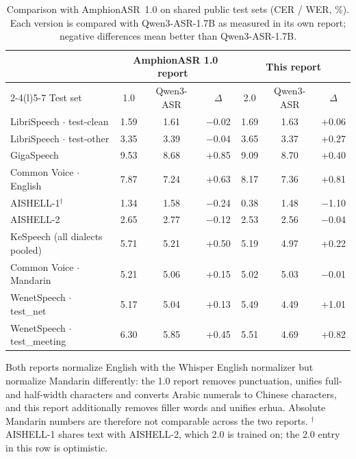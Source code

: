 \begin{table}[!tbp]
  \caption{Comparison with AmphionASR~1.0 on shared public test sets (CER / WER, \%). Each version is compared with Qwen3-ASR-1.7B as measured in its own report; negative differences mean better than Qwen3-ASR-1.7B.}
  \label{tab:vs_v1}
  \centering
  \small
  \setlength{\tabcolsep}{5pt}
  \begin{tabular}{@{}lcccccc@{}}
    \toprule
    & \multicolumn{3}{c}{AmphionASR 1.0 report~\cite{amphion2026amphionasr}} & \multicolumn{3}{c}{This report} \\
    \cmidrule(lr){2-4}\cmidrule(l){5-7}
    Test set & 1.0 & Qwen3-ASR & $\Delta$ & 2.0 & Qwen3-ASR & $\Delta$ \\
    \midrule
    LibriSpeech $\cdot$ test-clean & 1.59 & 1.61 & $-$0.02 & 1.69 & 1.63 & +0.06 \\
    LibriSpeech $\cdot$ test-other & 3.35 & 3.39 & $-$0.04 & 3.65 & 3.37 & +0.27 \\
    GigaSpeech & 9.53 & 8.68 & +0.85 & 9.09 & 8.70 & +0.40 \\
    Common Voice $\cdot$ English & 7.87 & 7.24 & +0.63 & 8.17 & 7.36 & +0.81 \\
    AISHELL-1$^\dagger$ & 1.34 & 1.58 & $-$0.24 & 0.38 & 1.48 & $-$1.10 \\
    AISHELL-2 & 2.65 & 2.77 & $-$0.12 & 2.53 & 2.56 & $-$0.04 \\
    KeSpeech (all dialects pooled) & 5.71 & 5.21 & +0.50 & 5.19 & 4.97 & +0.22 \\
    Common Voice $\cdot$ Mandarin & 5.21 & 5.06 & +0.15 & 5.02 & 5.03 & $-$0.01 \\
    WenetSpeech $\cdot$ test\_net & 5.17 & 5.04 & +0.13 & 5.49 & 4.49 & +1.01 \\
    WenetSpeech $\cdot$ test\_meeting & 6.30 & 5.85 & +0.45 & 5.51 & 4.69 & +0.82 \\
    \bottomrule
  \end{tabular}
  \par\smallskip
  {\footnotesize Both reports normalize English with the Whisper English normalizer but normalize Mandarin differently: the 1.0 report removes punctuation, unifies full- and half-width characters and converts Arabic numerals to Chinese characters, and this report additionally removes filler words and unifies erhua. Absolute Mandarin numbers are therefore not comparable across the two reports. $^\dagger$AISHELL-1 shares text with AISHELL-2, which 2.0 is trained on; the 2.0 entry in this row is optimistic.\par}
\end{table}

\FloatBarrier
